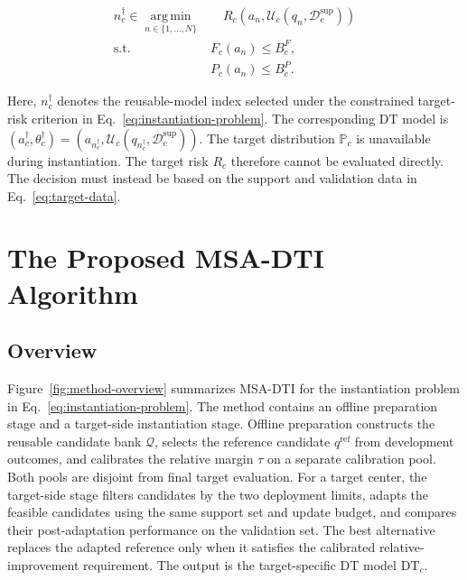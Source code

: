 \documentclass[a4paper,fleqn]{cas-sc}
\begin{document}
\begin{equation}
\begin{aligned}
n_c^\dagger
\in
\operatorname*{arg\,min}_{n\in\{1,\ldots,N\}}
&\quad
R_c\!\left(
a_n,
\mathcal{U}_c(q_n,\mathcal{D}_c^{\mathrm{sup}})
\right)
\\
\mathrm{s.t.}\quad
&F_c(a_n)\leq B_c^F,
\\
&P_c(a_n)\leq B_c^P.
\end{aligned}
\label{eq:instantiation-problem}
\end{equation}

Here, $n_c^\dagger$ denotes the reusable-model index selected under the
constrained target-risk criterion in Eq.~\eqref{eq:instantiation-problem}. The
corresponding DT model is
$\left(a_c^\dagger,\theta_c^\dagger\right)
=
\left(
a_{n_c^\dagger},
\mathcal{U}_c(q_{n_c^\dagger},\mathcal{D}_c^{\mathrm{sup}})
\right)$.
The target distribution $\mathbb{P}_c$ is unavailable during instantiation.
The target risk $R_c$ therefore cannot be evaluated directly. The decision
must instead be based on the support and validation data in
Eq.~\eqref{eq:target-data}.

\section{The Proposed MSA-DTI Algorithm}
\label{sec:method}

\subsection{Overview}

Figure~\ref{fig:method-overview} summarizes MSA-DTI for the instantiation
problem in Eq.~\eqref{eq:instantiation-problem}. The method contains an offline
preparation stage and a target-side instantiation stage. Offline preparation
constructs the reusable candidate bank $\mathcal{Q}$, selects the reference
candidate $q^{\mathrm{ref}}$ from development outcomes, and calibrates the
relative margin $\tau$ on a separate calibration pool. Both pools are
disjoint from final target evaluation. For a target
center, the target-side stage filters candidates by the two deployment limits,
adapts the feasible candidates using the same support set and update budget,
and compares their post-adaptation performance on the validation set. The best
alternative replaces the adapted reference only when it satisfies the
calibrated relative-improvement requirement. The output is the target-specific
DT model $\mathrm{DT}_c$.
\end{document}
